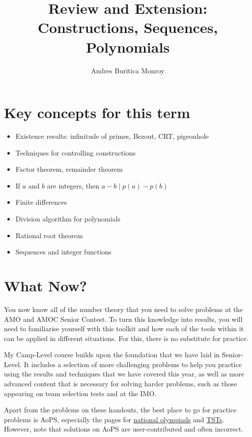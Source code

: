\documentclass{article}
\title{Review and Extension: Constructions, Sequences, Polynomials}
\author{Andres Buritica Monroy}
\date{}
\begin{document}
\maketitle
\section{Key concepts for this term}
\begin{itemize}
	\item Existence results: infinitude of primes, Bezout, CRT, pigeonhole
	\item Techniques for controlling constructions
	\item Factor theorem, remainder theorem
	\item If $a$ and $b$ are integers, then $a-b\mid p(a)-p(b)$
	\item Finite differences
	\item Division algorithm for polynomials
	\item Rational root theorem
	\item Sequences and integer functions
\end{itemize}
\section{What Now?}
You now know all of the number theory that you need to solve problems at
the AMO and AMOC Senior Contest. To turn this knowledge into results, you will
need to familiarise yourself with this toolkit and how each of the tools within it
can be applied in different situations. For this, there is no substitute for
practice.

My Camp-Level course builds upon the foundation that we have laid in
Senior-Level. It includes a selection of more challenging problems to help you
practice using the results and techniques that we have covered this year, as
well as more advanced content that is necessary for solving harder
problems, such as those appearing on team selection tests and at the IMO\@.

Apart from the problems on these handouts, the best place to go for
practice problems is AoPS, especially
the pages for \href{https://artofproblemsolving.com/community/c58}{national
	olympiads} and \href{https://artofproblemsolving.com/community/c59}{TSTs}.
However, note that solutions on AoPS are user-contributed and often incorrect.
\end{document}
